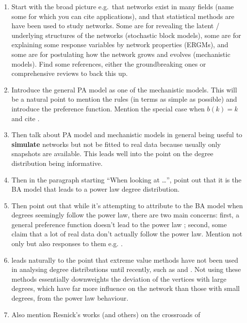 \documentclass[
  sn-basic,
]{sn-jnl}
\providecommand{\tightlist}{%
  \setlength{\itemsep}{0pt}\setlength{\parskip}{0pt}}
\theoremstyle{plain}
\theoremstyle{remark}
\begin{document}
\begin{enumerate}
  \begin{enumerate}
  \def\labelenumii{\alph{enumii}.}
  \tightlist
  \item
    Start with the broad picture e.g.~that networks exist in many fields
    (name some for which you can cite applications), and that
    statistical methods are have been used to study networks. Some are
    for revealing the latent / underlying structures of the networks
    (stochastic block models), some are for explaining some response
    variables by network properties (ERGMs), and some are for
    postulating how the network grows and evolves (mechanistic models).
    Find some references, either the groundbreaking ones or
    comprehensive reviews to back this up.
  \item
    Introduce the general PA model as one of the mechanistic models.
    This will be a natural point to mention the rules (in terms as
    simple as possible) and introduce the preference function. Mention
    the special case when \(b(k)=k\) and cite \citet{Barabasi99}.
  \item
    Then talk about PA model and mechanistic models in general being
    useful to \textbf{simulate} networks but not be fitted to real data
    because usually only snapshots are available. This leads well into
    the point on the degree distribution being informative.
  \item
    Then in the paragraph starting ``When looking at \ldots{}'', point
    out that it is the BA model \citep{Barabasi99} that leads to a power
    law degree distribution.
  \item
    Then point out that while it's attempting to attribute to the BA
    model when degrees seemingly follow the power law, there are two
    main concerns: first, a general preference function doesn't lead to
    the power law \citep{krapivsky01}; second, some claim that a lot of
    real data don't actually follow the power law. Mention not only
    \citet{Broido_2019} but also responses to them e.g. \citet{vvvk19}.
  \item
    \citet{vvvk19} leads naturally to the point that extreme value
    methods have not been used in analysing degree distributions until
    recently, such as \citet{vvvk19} and \citet{lef24}. Not using these
    methods essentially downweights the deviation of the vertices with
    large degrees, which have far more influence on the network than
    those with small degrees, from the power law behaviour.
  \item
    Also mention Resnick's works (and others) on the crossroads of

\end{enumerate}
\end{enumerate}
\end{document}
